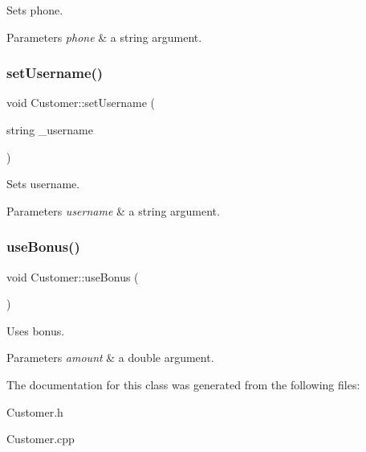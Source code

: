 Sets phone. 


\begin{DoxyParams}{Parameters}
{\em phone} & a string argument. \\
\hline
\end{DoxyParams}
\mbox{\label{classCustomer_ab794d5fb843d86eeb79c79dab75302f6}} 
\subsubsection{\texorpdfstring{set\+Username()}{setUsername()}}
{\footnotesize\ttfamily void Customer\+::set\+Username (\begin{DoxyParamCaption}\item[{string}]{\+\_\+username }\end{DoxyParamCaption})}



Sets username. 


\begin{DoxyParams}{Parameters}
{\em username} & a string argument. \\
\hline
\end{DoxyParams}
\mbox{\label{classCustomer_ab5a0e54395ef83bef1f51a3a98b30ec4}} 
\subsubsection{\texorpdfstring{use\+Bonus()}{useBonus()}}
{\footnotesize\ttfamily void Customer\+::use\+Bonus (\begin{DoxyParamCaption}{ }\end{DoxyParamCaption})}



Uses bonus. 


\begin{DoxyParams}{Parameters}
{\em amount} & a double argument. \\
\hline
\end{DoxyParams}


The documentation for this class was generated from the following files\+:\begin{DoxyCompactItemize}
\item 
Customer.\+h\item 
Customer.\+cpp\end{DoxyCompactItemize}
